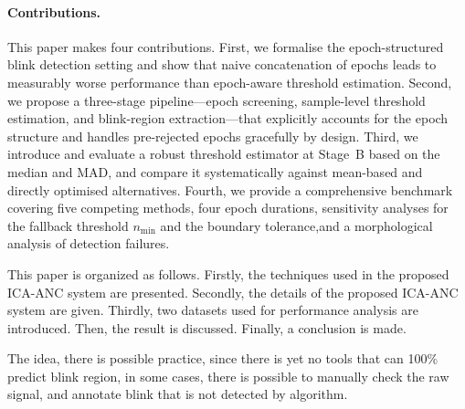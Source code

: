\paragraph{Contributions.}
This paper makes four contributions. First, we formalise the epoch-structured blink detection setting and show that naive concatenation of epochs leads to measurably worse performance than epoch-aware threshold estimation.
%
Second, we propose a three-stage pipeline---epoch screening, sample-level threshold estimation, and blink-region
extraction---that explicitly accounts for the epoch structure and handles pre-rejected epochs gracefully by design.
Third, we introduce and evaluate a robust threshold estimator at Stage~B based on the median and MAD, and compare it systematically against mean-based and directly optimised alternatives.
Fourth, we provide a comprehensive benchmark covering five competing methods, four epoch durations, sensitivity analyses for the fallback threshold $n_{\min}$ and the boundary tolerance,and a morphological analysis of detection failures.


This paper is organized as follows. Firstly, the techniques used in the proposed ICA-ANC system are presented. Secondly, the details of the proposed ICA-ANC system are given. Thirdly, two datasets used for performance analysis are introduced. Then, the result is discussed. Finally, a conclusion is made.


The idea, there is possible practice, since there is yet no tools that can 100\% predict blink region, in some cases, there is possible to manually check the raw signal, and annotate blink that is not detected by algorithm.